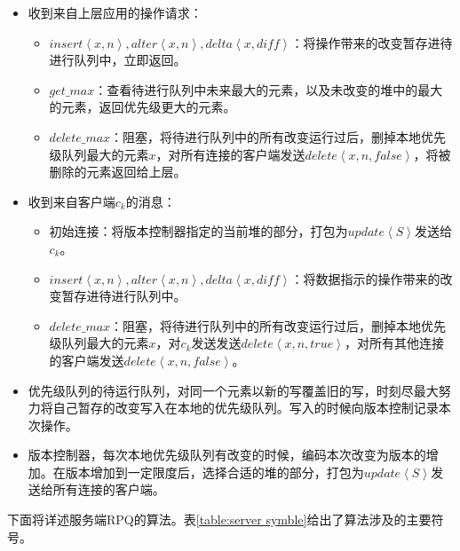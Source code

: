 		\begin{itemize}
			\item 收到来自上层应用的操作请求：
			\begin{itemize}
				\item $insert\left\langle x,n\right\rangle ,alter\left\langle x,n\right\rangle ,delta\left\langle x,diff\right\rangle $：将操作带来的改变暂存进待进行队列中，立即返回。
				\item $get\_max$：查看待进行队列中未来最大的元素，以及未改变的堆中的最大的元素，返回优先级更大的元素。
				\item $delete\_max$：阻塞，将待进行队列中的所有改变运行过后，删掉本地优先级队列最大的元素$x$，对所有连接的客户端发送$delete\left\langle x,n,\textit{false}\right\rangle $，将被删除的元素返回给上层。
			\end{itemize}
			\item 收到来自客户端$c_k$的消息：
			\begin{itemize}
				\item 初始连接：将版本控制器指定的当前堆的部分，打包为$update\left\langle S\right\rangle $发送给$c_k$。
				\item $insert\left\langle x,n\right\rangle ,alter\left\langle x,n\right\rangle ,delta\left\langle x,diff\right\rangle $：将数据指示的操作带来的改变暂存进待进行队列中。
				\item $delete\_max$：阻塞，将待进行队列中的所有改变运行过后，删掉本地优先级队列最大的元素$x$，对$c_k$发送发送$delete\left\langle x,n,\textit{true}\right\rangle $，对所有其他连接的客户端发送$delete\left\langle x,n,\textit{false}\right\rangle $。
			\end{itemize}
			\item 优先级队列的待运行队列，对同一个元素以新的写覆盖旧的写，时刻尽最大努力将自己暂存的改变写入在本地的优先级队列。写入的时候向版本控制记录本次操作。
			\item 版本控制器，每次本地优先级队列有改变的时候，编码本次改变为版本的增加。在版本增加到一定限度后，选择合适的堆的部分，打包为$update\left\langle S\right\rangle $发送给所有连接的客户端。
		\end{itemize}
		\par 下面将详述服务端RPQ的算法。表\ref{table:server symble}给出了算法涉及的主要符号。
